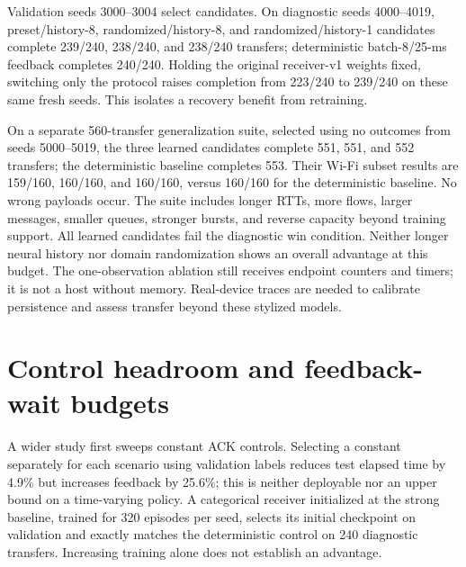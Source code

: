 \documentclass[11pt]{article}
\begin{document}
Validation seeds 3000--3004 select candidates. On diagnostic seeds 4000--4019,
preset/history-8, randomized/history-8, and randomized/history-1 candidates
complete 239/240, 238/240, and 238/240 transfers; deterministic batch-8/25-ms
feedback completes 240/240. Holding the original receiver-v1 weights fixed,
switching only the protocol raises completion from 223/240 to 239/240 on these
same fresh seeds. This isolates a recovery benefit from retraining.

On a separate 560-transfer generalization suite, selected using no outcomes from
seeds 5000--5019, the three learned candidates complete 551, 551, and 552
transfers; the deterministic baseline completes 553. Their Wi-Fi subset results
are 159/160, 160/160, and 160/160, versus 160/160 for the deterministic baseline.
No wrong payloads occur. The suite includes longer RTTs, more flows, larger
messages, smaller queues, stronger bursts, and reverse capacity beyond training
support. All learned candidates fail the diagnostic win condition. Neither
longer neural history nor domain randomization shows an overall advantage at
this budget. The one-observation ablation still receives endpoint counters and
timers; it is not a host without memory. Real-device traces are needed to
calibrate persistence and assess transfer beyond these stylized models.

\section{Control headroom and feedback-wait budgets}
A wider study first sweeps constant ACK controls. Selecting a constant separately
for each scenario using validation labels reduces test elapsed time by 4.9\%
but increases feedback by 25.6\%; this is neither deployable nor an upper bound
on a time-varying policy. A categorical receiver initialized at the strong
baseline, trained for 320 episodes per seed, selects its initial checkpoint on
validation and exactly matches the deterministic control on 240 diagnostic
transfers. Increasing training alone does not establish an advantage.
\end{document}
